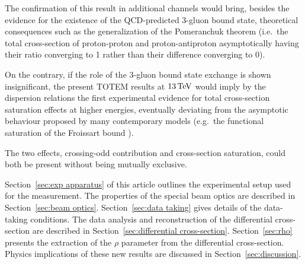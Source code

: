 The confirmation of this result in additional channels would bring, besides the evidence for the existence of the QCD-predicted 3-gluon bound state, theoretical consequences such as the generalization of the Pomeranchuk theorem (i.e.~the total cross-section of proton-proton and proton-antiproton asymptotically having their ratio converging to 1 rather than their difference converging to 0).

On the contrary, if the role of the 3-gluon bound state exchange is shown insignificant, the present TOTEM results at $13\,{\rm TeV}$ would imply by the dispersion relations the first experimental evidence for total cross-section saturation effects at higher energies, eventually deviating from the asymptotic behaviour proposed by many contemporary models (e.g.~the functional saturation of the Froissart bound \cite{froissart-1961}).

The two effects, crossing-odd contribution and cross-section saturation, could both be present without being mutually exclusive.


Section~\ref{sec:exp apparatus} of this article outlines the experimental setup used for the measurement. The properties of the special beam optics are described in Section~\ref{sec:beam optics}. Section~\ref{sec:data taking} gives details of the data-taking conditions. The data analysis and reconstruction of the differential cross-section are described in Section~\ref{sec:differential cross-section}. Section~\ref{sec:rho} presents the extraction of the $\rho$ parameter from the differential cross-section. Physics implications of these new results are discussed in Section~\ref{sec:discussion}.
